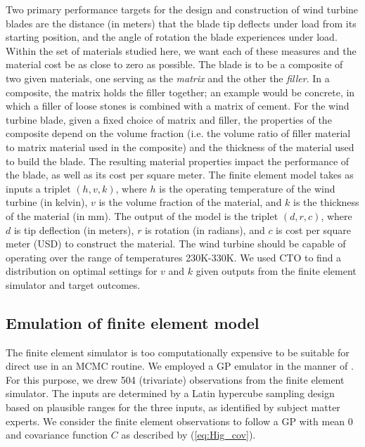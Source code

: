 \documentclass[12pt]{article}
\begin{document}
Two primary performance targets for the design and construction of wind turbine blades are the distance (in meters) that the blade tip deflects under load from its starting position, and the angle of rotation the blade experiences under load.
%
Within the set of materials studied here, we want each of these measures and the material cost be as close to zero as possible.
%
The blade is to be a composite of two given materials, one serving as the \textit{matrix} and the other the \textit{filler}. 
%
In a composite, the matrix holds the filler together; an example would be concrete, in which a filler of loose stones is combined with a matrix of cement.
%
For the wind turbine blade, given a fixed choice of matrix and filler, the properties of the composite depend on the volume fraction (i.e. the volume ratio of filler material to matrix material used in the composite) and the thickness of the material used to build the blade. 
%
The resulting material properties impact the performance of the blade, as well as its cost per square meter. 
%
The finite element model takes as inputs a triplet $(h,v,k)$, where $h$ is the operating temperature of the wind turbine (in kelvin), $v$ is the volume fraction of the material, and $k$ is the thickness of the material (in mm). 
%
The output of the model is the triplet $(d,r,c)$, where $d$ is tip deflection (in meters), $r$ is rotation (in radians), and $c$ is cost per square meter (USD) to construct the material.
% 
The wind turbine should be capable of operating over the range of temperatures 230K-330K. 
%
We used CTO to find a distribution on optimal settings for $v$ and $k$ given outputs from the finite element simulator and target outcomes.

\subsection{Emulation of finite element model}\label{emulator}
The finite element simulator is too computationally expensive to be suitable for direct use in an MCMC routine. 
%
We employed a GP emulator in the manner of \cite{Williams2006}. 
%
For this purpose, we drew 504 (trivariate) observations from the finite element simulator. 
%
The inputs are determined by a Latin hypercube sampling design \citep{McKay1979} based on plausible ranges for the three inputs, as identified by subject matter experts.
%
We consider the finite element observations to follow a GP with mean 0 and covariance function $C$ as described by (\ref{eq:Hig_cov}).
%
\end{document}
